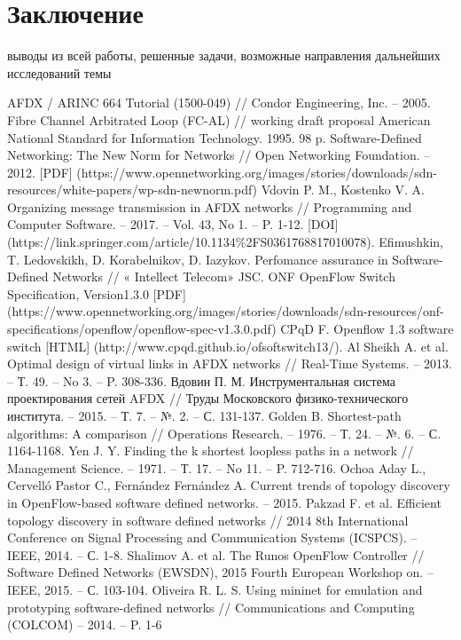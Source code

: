 \documentclass[12pt, a4paper]{article}
\begin{document}
\section*{Заключение}
выводы из всей работы, решенные задачи, возможные направления дальнейших исследований темы 

\renewcommand{\bibname}{Список литературы}
\addcontentsline{toc}{section}{\bibname}

\begin{thebibliography}{}
	AFDX / ARINC 664 Tutorial (1500-049) // Condor Engineering, Inc. -- 2005.
	Fibre Channel Arbitrated Loop (FC-AL) // working draft proposal American National Standard for Information Technology. 1995. 98 p.
	Software-Defined Networking: The New Norm for Networks // Open Networking Foundation. -- 2012. [PDF] (https://www.opennetworking.org/images/stories/downloads/sdn-resources/white-papers/wp-sdn-newnorm.pdf)
	Vdovin P. M., Kostenko V. A. Organizing message transmission in AFDX networks // Programming and Computer Software. -- 2017. -- Vol. 43, No 1. -- P. 1-12. [DOI] (https://link.springer.com/article/10.1134\%2FS0361768817010078).
	Efimushkin, T. Ledovskikh, D. Korabelnikov, D. Iazykov. Perfomance assurance in Software-Defined Networks // « Intellect Telecom» JSC.
	ONF OpenFlow Switch Specification, Version1.3.0 [PDF] (https://www.opennetworking.org/images/stories/downloads/sdn-resources/onf-specifications/openflow/openflow-spec-v1.3.0.pdf)
	CPqD F. Openflow 1.3 software switch [HTML] (http://www.cpqd.github.io/ofsoftswitch13/).
	Al Sheikh A. et al. Optimal design of virtual links in AFDX networks // Real-Time Systems. -- 2013. -- Т. 49. -- No 3. -- P. 308-336.
	Вдовин П. М. Инструментальная система проектирования сетей AFDX // Труды Московского физико-технического института. -- 2015. -- Т. 7. -- №. 2. -- С. 131-137.
	Golden B. Shortest-path algorithms: A comparison // Operations Research. -- 1976. -- Т. 24. -- №. 6. -- С. 1164-1168.
	Yen J. Y. Finding the k shortest loopless paths in a network // Management Science. -- 1971. -- Т. 17. -- No 11. -- P. 712-716.
	Ochoa Aday L., Cervelló Pastor C., Fernández Fernández A. Current trends of topology discovery in OpenFlow-based software defined networks. -- 2015.
	Pakzad F. et al. Efficient topology discovery in software defined networks // 2014 8th International Conference on Signal Processing and Communication Systems (ICSPCS). -- IEEE, 2014. -- С. 1-8.
	Shalimov A. et al. The Runos OpenFlow Controller // Software Defined Networks (EWSDN), 2015 Fourth European Workshop on. -- IEEE, 2015. -- С. 103-104.
	Oliveira R. L. S. Using mininet for emulation and prototyping software-defined networks // Communications and Computing (COLCOM) -- 2014. -- P. 1-6
\end{thebibliography}
\end{document}
